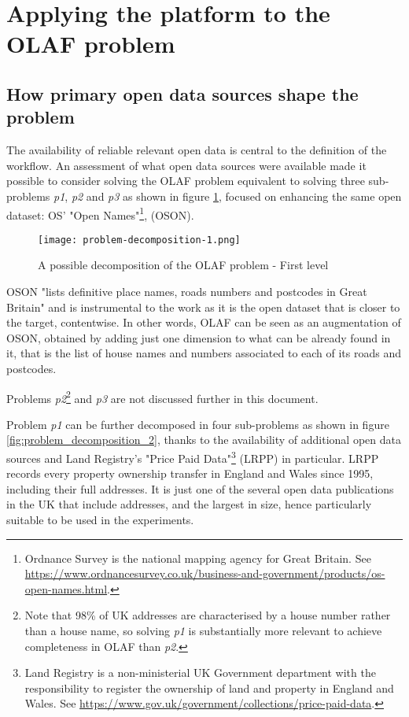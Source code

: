 \section{Applying the platform to the OLAF problem}
\label{crowdsourcing-olaf}

\subsection{How primary open data sources shape the problem}

The availability of reliable relevant open data is central to the definition of the workflow. An assessment of what open data sources were available made it possible to consider solving the OLAF problem equivalent to solving three sub-problems {\it p1}, {\it p2} and {\it p3} as shown in figure \ref{fig:problem_decomposition_1}, focused on enhancing the same open dataset: OS' "Open Names"\footnote{Ordnance Survey is the national mapping agency for Great Britain. See \url{https://www.ordnancesurvey.co.uk/business-and-government/products/os-open-names.html}.}, (OSON).

\begin{figure}
	\texttt{[image: problem-decomposition-1.png]}
	\caption{A possible decomposition of the OLAF problem - First level}
	\label{fig:problem_decomposition_1}
\end{figure}

OSON "lists definitive place names, roads numbers and postcodes in Great Britain" and is instrumental to the work as it is the open dataset that is closer to the target, contentwise. In other words, OLAF can be seen as an augmentation of OSON, obtained by adding just one dimension to what can be already found in it, that is the list of house names and numbers associated to each of its roads and postcodes. 
    
Problems {\it p2}\footnote{Note that 98\% of UK addresses are characterised by a house number rather than a house name, so solving {\it p1} is substantially more relevant to achieve completeness in OLAF than {\it p2}.} and {\it p3} are not discussed further in this document. 

Problem {\it p1} can be further decomposed in four sub-problems as shown in figure \ref{fig:problem_decomposition_2}, thanks to the availability of additional open data sources and Land Registry's "Price Paid Data"\footnote{Land Registry is a non-ministerial UK Government department with the responsibility to register the ownership of land and property in England and Wales. See \url{https://www.gov.uk/government/collections/price-paid-data}.} (LRPP) in particular. LRPP records every property ownership transfer in England and Wales since 1995, including their full addresses. It is just one of the several open data publications in the UK that include addresses, and the largest in size, hence particularly suitable to be used in the experiments.
    
